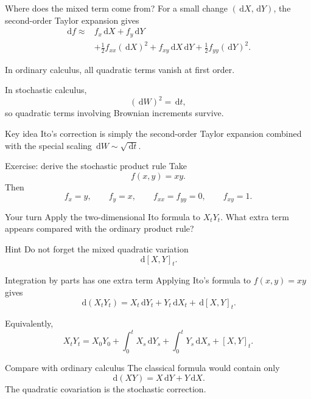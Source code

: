 \documentclass[handout,10pt,aspectratio=169]{beamer}
\newcommand{\dd}{\,\mathrm d}
\begin{document}
\begin{frame}{Where does the mixed term come from?}
For a small change \((\dd X,\dd Y)\), the second-order Taylor expansion gives
\[
\begin{aligned}
\dd f
\approx{}&
f_x\dd X+f_y\dd Y\\
&+\frac12 f_{xx}(\dd X)^2
+f_{xy}\dd X\dd Y
+\frac12 f_{yy}(\dd Y)^2.
\end{aligned}
\]

In ordinary calculus, all quadratic terms vanish at first order.

In stochastic calculus,
\[
(\dd W)^2=\dd t,
\]
so quadratic terms involving Brownian increments survive.

\begin{block}{Key idea}
Ito's correction is simply the second-order Taylor expansion combined with
the special scaling \(\dd W\sim\sqrt{\dd t}\).
\end{block}
\end{frame}


\begin{frame}{Exercise: derive the stochastic product rule}
Take
\[
f(x,y)=xy.
\]
Then
\[
f_x=y,\qquad f_y=x,
\qquad f_{xx}=f_{yy}=0,
\qquad f_{xy}=1.
\]

\begin{block}{Your turn}
Apply the two-dimensional Ito formula to \(X_tY_t\).
What extra term appears compared with the ordinary product rule?
\end{block}

\vspace{0.3cm}

\begin{alertblock}{Hint}
Do not forget the mixed quadratic variation
\[
\dd[X,Y]_t.
\]
\end{alertblock}
\end{frame}


\begin{frame}{Integration by parts has one extra term}
Applying Ito's formula to \(f(x,y)=xy\) gives
\[
\boxed{
\dd(X_tY_t)
=
X_t\dd Y_t
+
Y_t\dd X_t
+
\dd[X,Y]_t.}
\]

Equivalently,
\[
\boxed{
X_tY_t
=
X_0Y_0
+\int_0^t X_s\dd Y_s
+\int_0^t Y_s\dd X_s
+[X,Y]_t.}
\]

\begin{block}{Compare with ordinary calculus}
The classical formula would contain only
\[
\dd(XY)=X\dd Y+Y\dd X.
\]
The quadratic covariation is the stochastic correction.
\end{block}
\end{frame}
\end{document}
